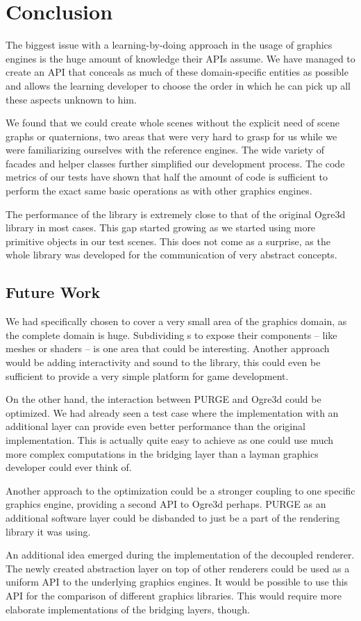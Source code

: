 \chapter{Conclusion}

	The biggest issue with a learning-by-doing approach in the usage of graphics engines is the huge amount of knowledge their APIs assume. We have managed to create an API that conceals as much of these domain-specific entities as possible and allows the learning developer to choose the order in which he can pick up all these aspects unknown to him.

	We found that we could create whole scenes without the explicit need of scene graphs or quaternions, two areas that were very hard to grasp for us while we were familiarizing ourselves with the reference engines. The wide variety of facades and helper classes further simplified our development process. The code metrics of our tests have shown that half the amount of code is sufficient to perform the exact same basic operations as with other graphics engines.

	The performance of the library is extremely close to that of the original Ogre3d library in most cases. This gap started growing as we started using more primitive objects in our test scenes. This does not come as a surprise, as the whole library was developed for the communication of very abstract concepts.
	
	\section{Future Work}

		We had specifically chosen to cover a very small area of the graphics domain, as the complete domain is huge. Subdividing s to expose their components -- like meshes or shaders -- is one area that could be interesting. Another approach would be adding interactivity and sound to the library, this could even be sufficient to provide a very simple platform for game development.

		On the other hand, the interaction between PURGE and Ogre3d could be optimized. We had already seen a test case where the implementation with an additional layer can provide even better performance than the original implementation. This is actually quite easy to achieve as one could use much more complex computations in the bridging layer than a layman graphics developer could ever think of.

		Another approach to the optimization could be a stronger coupling to one specific graphics engine, providing a second API to Ogre3d perhaps. PURGE as an additional software layer could be disbanded to just be a part of the rendering library it was using.

		An additional idea emerged during the implementation of the decoupled renderer. The newly created abstraction layer on top of other renderers could be used as a uniform API to the underlying graphics engines. It would be possible to use this API for the comparison of different graphics libraries. This would require more elaborate implementations of the bridging layers, though.

